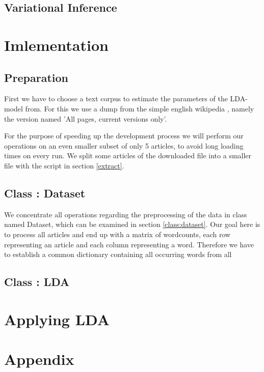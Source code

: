 \documentclass[15pt,landscape,twopage]{article}
\begin{document}
\subsection{Variational Inference}


\section{Imlementation}
\subsection{Preparation}
First we have to choose a text corpus to estimate the parameters of the LDA-model from. For this we use a dump from the simple english wikipedia \cite{simplewi84:online}, namely the version named 'All pages, current versions only'.

For the purpose of speeding up the development process we will perform our operations on an even smaller subset of only 5 articles, to avoid long loading times on every run. We split some articles of the downloaded file into a smaller file with the script in section \ref{extract}.

\subsection{Class : Dataset}
We concentrate all operations regarding the preprocessing of the data in class named Dataset, which can be examined in section  \ref{class:dataset}. Our goal here is to process all articles and end up with a matrix of wordcounts, each row representing an article and each column representing a word. Therefore we have to establish a common dictionary containing all occurring words from all

\subsection{Class : LDA}

\section{Applying LDA}
\newpage




\newpage

\section{Appendix}
\end{document}
